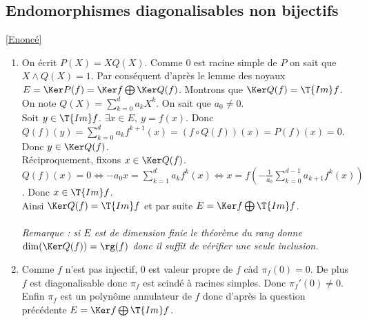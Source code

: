 \documentclass[8pt]{book}
\begin{document}
	\subsection{Endomorphismes diagonalisables non bijectifs }
	\label{Endomorphismes diagonalisables non bijectifs corrigé}
	\textcolor{blue}{\hyperref[Endomorphismes diagonalisables non bijectifs]{[Enoncé]}}\\
	\begin{enumerate}
		\item On écrit $P(X)=XQ(X)$. Comme $0$ est racine simple de $P$ on sait que $X\wedge Q(X)=1$. Par conséquent d'après le lemme des noyaux $E=\Ker P(f)=\Ker f\bigoplus\Ker Q(f)$. Montrons que $\Ker Q(f)=\T{Im}f$. On note $Q(X)=\displaystyle\sum_{k=0}^da_kX^k$. On sait que $a_0\ne 0$.\\
		Soit $y\in \T{Im}f$. $\exists x\in E,\ y=f(x)$. Donc $Q(f)(y)=\displaystyle\sum_{k=0}^da_kf^{k+1}(x)=(f\circ Q(f))(x)=P(f)(x)=0$. Donc $y\in \Ker Q(f)$.\\
		Réciproquement, fixons $x\in \Ker Q(f)$. $Q(f)(x)=0\iff -a_0x=\displaystyle\sum_{k=1}^da_kf^k(x)\iff x=f\left(-\frac{1}{a_0}\sum_{k=0}^{d-1}a_{k+1}f^k(x)\right)$. Donc $x\in \T{Im}f$.\\
		Ainsi $\Ker Q(f)=\T{Im}f$ et par suite $E=\Ker f\bigoplus\T{Im}f$.\\\\
		\textit{Remarque : si $E$ est de dimension finie le théorème du rang donne $\dim(\Ker Q(f))=\rg(f)$ donc il suffit de vérifier une seule inclusion.}
		\item Comme $f$ n'est pas injectif, $0$ est valeur propre de $f$ càd $\pi_f(0)=0$. De plus $f$ est diagonalisable donc $\pi_f$ est scindé à racines simples. Donc $\pi_f'(0)\ne 0$. Enfin $\pi_f$ est un polynôme annulateur de $f$ donc d'après la question précédente $E=\Ker f\bigoplus \T{Im}f$.
	\end{enumerate}
	
\end{document}
